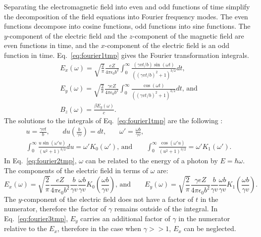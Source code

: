     Separating the electromagnetic field into even and odd functions of time 
      simplify the decomposition of the field equations into Fourier frequency 
      modes.
    The even functions decompose into cosine functions, odd functions 
      into sine functions. 
    The $y$-component of the electric field and the $z$-component of 
      the magnetic field are even functions in time, and the 
      $x$-component of the electric field is an odd function in time.
    Eq.~\ref{eq:fourier1tmp} gives the Fourier transformation integrals. 
    \begin{eqnarray} \label{eq:fourier1tmp}
        E_{x}(\omega)=\sqrt{\frac{2}{\pi}}\frac{eZ}{4\pi\epsilon_{0}b^{2}}
         \int^{\infty}_{0}\frac{\left(\gamma vt/b\right)\sin
         \left(\omega t\right)}
         {\left(\left(\gamma vt/b\right)^{2}+1\right)^{3/2}}dt\textrm{,} \nonumber\\
          E_{y}(\omega)=\sqrt{\frac{2}{\pi}}\frac{\gamma eZ}
         {4\pi\epsilon_{0}b^{2}} \int^{\infty}_{0}\frac{\cos(\omega t)}
         {\left(\left(\gamma vt/b\right)^{2}+1\right)^{3/2}}dt\textrm{,  and}\\
          B_{z}(\omega)=\frac{\beta E_{y}(\omega)}{c}.\nonumber
    \end{eqnarray}
    The solutions to the integrals of Eq.~\ref{eq:fourier1tmp} are the following
      \cite{WWFermi}:
    \begin{eqnarray}  \label{eq:fourier2tmp}
      u=\frac{\gamma v t}{b}\textrm{,}\qquad du\left(\frac{b}{\gamma v}\right)=dt\textrm{,}\qquad
      \omega'=\frac{\omega b}{\gamma v}\textrm{,}\nonumber \\
      \int^{\infty}_{0}\frac{u \sin(\omega'u)}{\left(u^{2}+1\right)^{3/2}}du
      =\omega'K_{0}(\omega')\textrm{, and}\qquad
      \int^{\infty}_{0}\frac{\cos(\omega'u)}{\left(u^{2}+1\right)^{3/2}}
      =\omega'K_{1}(\omega').
    \end{eqnarray}
    In Eq.~\ref{eq:fourier2tmp}, $\omega$ can be related to the energy of a 
      photon by $E=\hbar\omega$.
    The components of the electric field in terms of $\omega$ are:
    \begin{equation} \label{eq:fourier3tmp}
        E_{x}(\omega)=\sqrt{\frac{2}{\pi}}\frac{eZ}{4\pi\epsilon_{0}b^{2}}
     \frac{b}{\gamma v}\frac{\omega b}{\gamma v}K_{0}
     \left(\frac{\omega b}{\gamma v}\right)\textrm{, and}\qquad
      E_{y}(\omega)=\sqrt{\frac{2}{\pi}}\frac{\gamma eZ}{4\pi\epsilon_{0}b^{2}}
     \frac{b}{\gamma v}\frac{\omega b}{\gamma v}K_{1}
     \left(\frac{\omega b}{\gamma v}\right).\qquad
    \end{equation}
    The $y$-component of the electric field does not have a factor of $t$ in 
      the numerator, therefore the factor of $\gamma$ remains outside of the 
      integral.
    In Eq.~\ref{eq:fourier3tmp}, $E_{y}$ carries an additional factor of 
      $\gamma$ in the numerator relative to the $E_{x}$, therefore in the case
      when $\gamma >> 1$, $E_{x}$ can be neglected. 

